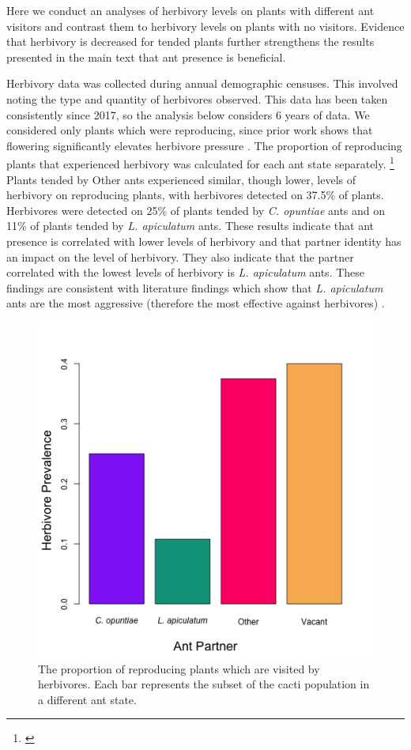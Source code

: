 \documentclass[11pt]{article}
\newcommand{\tom}[2]{{\color{red}{#1}}\footnote{\textit{\color{red}{#2}}}}
\begin{document}
Here we conduct  an analyses of herbivory levels on plants with different ant visitors and contrast them to herbivory levels on plants with no visitors.
Evidence that herbivory is decreased for tended plants further strengthens the results presented in the main text that ant presence is beneficial.

Herbivory data was collected during annual demographic censuses. 
This involved noting the type and quantity of herbivores observed. 
This data has been taken consistently since 2017, so the analysis below considers 6 years of data.
We considered only plants which were reproducing, since prior work shows that flowering significantly elevates herbivore pressure \citep{Miller2006}.
The proportion of reproducing plants that experienced herbivory was calculated for each ant state separately.
\tom{Analysis showed that ant presence is correlated with lower herbivore visitation.
40\% of vacant cacti experienced herbivory.}{It is unclear what quantity is shown in the figure. It is important to clarify this.}
Plants tended by Other ants experienced similar, though lower, levels of herbivory on reproducing plants, with herbivores detected on 37.5\% of plants.
Herbivores were detected on 25\% of plants tended by \textit{C. opuntiae} ants and on 11\% of plants tended by \textit{L. apiculatum} ants.
These results indicate that ant presence is correlated with lower levels of herbivory and that partner identity has an impact on the level of herbivory.
They also indicate that the partner correlated with the lowest levels of herbivory is \textit{L. apiculatum} ants.
These findings are consistent with literature findings which show that \textit{L. apiculatum} ants are the most aggressive (therefore the most effective against herbivores) \citep{Miller2007}.

\renewcommand{\thefigure}{A\arabic{figure}}

\begin{figure}[H]
	\includegraphics[width=0.7\linewidth]{Figures/herb_all.png}
	\caption{The proportion of reproducing plants which are visited by herbivores. Each bar represents the subset of the cacti population in a different ant state.  }
	\label{app:herb}
\end{figure}
\end{document}

